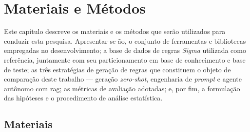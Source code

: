 
\chapter{Materiais e Métodos}\label{cap:materialemetodos}

Este capítulo descreve os materiais e os métodos que serão utilizados para conduzir esta pesquisa.
Apresentar-se-ão, o conjunto de ferramentas e bibliotecas empregadas no desenvolvimento; 
a base de dados de regras \textit{Sigma} utilizada como referência, juntamente com seu particionamento em base de conhecimento e base de teste; 
as três estratégias de geração de regras que constituem o objeto de comparação deste trabalho --- geração \textit{\gls{zero-shot}}, engenharia de \textit{prompt} e agente autônomo com \gls{rag}; 
as métricas de avaliação adotadas; e, por fim, a formulação das hipóteses e o procedimento de análise estatística. 

\section{Materiais}\label{sec:materiais}

